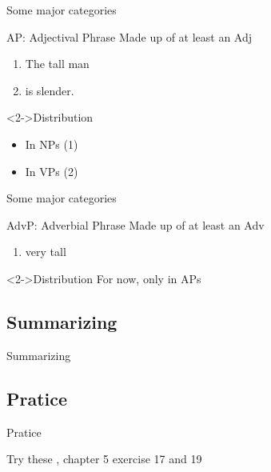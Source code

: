 \documentclass{beamer}
\newcommand{\subonetwo}{Some major categories}
\newcommand{\subonethree}{Summarizing}
\newcommand{\subonefour}{Pratice}
\begin{document}
      \begin{frame}{\subonetwo}
        \begin{block}{AP: Adjectival Phrase}
          Made up of at least an Adj
        \end{block}
        \begin{example}
          \begin{enumerate}
            \item \only<2->{[NP }The \only<2->{[AP }tall\only<2->{]} man\only<2->{]}
            \item \only<3->{[VP }is \only<3->{[AP }slender\only<3->{]}.\only<3->{]}
          \end{enumerate}
        \end{example}
        \begin{block}<2->{Distribution}
          \begin{itemize}
            \item<2-> In NPs (1)
            \item<3-> In VPs (2)
          \end{itemize}
        \end{block}
      \end{frame}

      \begin{frame}{\subonetwo}
        \begin{block}{AdvP: Adverbial Phrase}
          Made up of at least an Adv
        \end{block}
        \begin{example}
          \begin{enumerate}
            \item \only<2->{[AP [AdvP }very\only<2->{]} tall\only<2->{]}
          \end{enumerate}
        \end{example}
        \begin{block}<2->{Distribution}
          For now, only in APs
        \end{block}
      \end{frame}

    \subsection{\subonethree}
      \begin{frame}{\subonethree}
        \small
          
      \end{frame}

    \subsection{\subonefour}
      \begin{frame}{\subonefour}
        \begin{block}{Try these}
          \textcite{dawson_language_2016}, chapter 5 exercise 17 and 19
        \end{block}
      \end{frame}
\end{document}

